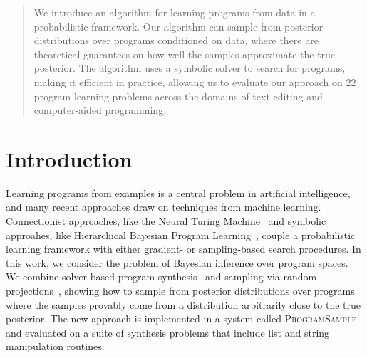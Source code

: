 \documentclass{article}
\newcommand{\theSystem}{\textsc{ProgramSample}}
\begin{document}
 


\begin{abstract}
We introduce an algorithm for learning programs from data in a probabilistic framework.
Our algorithm can sample from posterior distributions over programs conditioned on data, where there are theoretical guarantees on how well the samples approximate the true posterior.
The algorithm uses a symbolic solver to search for programs, making it efficient in practice, allowing us to evaluate our approach on 22 program learning problems across the domains of text editing and computer-aided programming.
\end{abstract} 

\section{Introduction}
\label{introduction}
Learning programs from examples is a central problem in artificial intelligence, and many recent approaches draw on techniques from machine learning.
Connectionist approaches, like the Neural Turing Machine~\cite{graves2014neural} and symbolic approahes, like Hierarchical Bayesian Program Learning~\cite{lake2015human,DBLP:conf/icml/LiangJK10,menon2013machine},
couple a probabilistic learning framework with either gradient- or sampling-based search procedures.
In this work,
we consider the problem of Bayesian inference over program spaces.
We combine solver-based program synthesis~\cite{solar2008program} and sampling via random projections~\cite{ermon2013embed},
showing how to sample from posterior distributions over programs where the samples provably come from a distribution arbitrarily close to the true posterior. The new approach is implemented in a system called \theSystem{}
and evaluated on a suite of synthesis problems that include list 
and string manipulation routines. 
\end{document}
